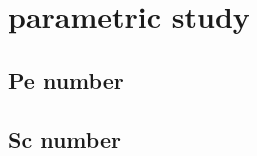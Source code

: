 \documentclass[../thesis.tex]{subfiles}
\begin{document}
\chapter{parametric study}

\section{Pe number}

\section{Sc number}
\end{document}
